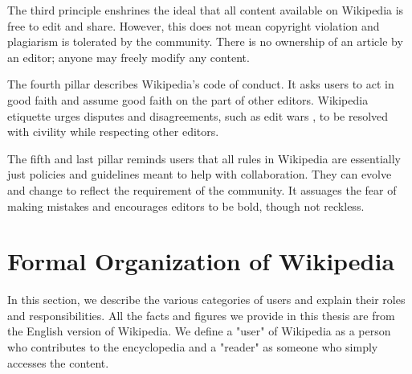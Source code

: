 The third principle enshrines the ideal that all content available on Wikipedia is free to edit and share.
However, this does not mean copyright violation and plagiarism is tolerated by the community.
There is no ownership of an article by an editor; anyone may freely modify any content.

The fourth pillar describes Wikipedia's code of conduct.
It asks users to act in good faith and assume good faith on the part of other editors.
Wikipedia etiquette urges disputes and disagreements, such as edit wars \cite{wiki:edit-wars}, to be resolved with civility while respecting other editors.

The fifth and last pillar reminds users that all rules in Wikipedia are essentially just policies and guidelines meant to help with collaboration.
They can evolve and change to reflect the requirement of the community.
It assuages the fear of making mistakes and encourages editors to be bold, though not reckless. 

\section{Formal Organization of Wikipedia}
\label{sec:formal-org-wikipedia}
In this section, we describe the various categories of users and explain their roles and responsibilities.
All the facts and figures we provide in this thesis are from the English version of Wikipedia.
We define a "user" of Wikipedia as a person who contributes to the encyclopedia and a "reader" as someone who simply accesses the content.

